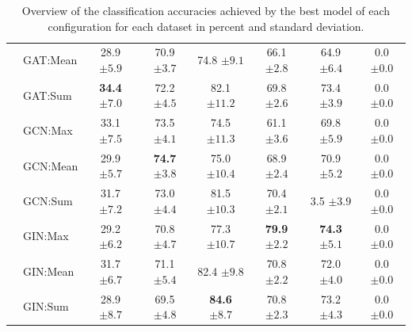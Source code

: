 \begin{table}
{\begin{tabular}{@{}c <{\enspace}@{}lcccccc@{}}
			\\ 
			& \textsf{GAT:Mean}    & 28.9 \scriptsize $\pm 5.9$          & 70.9 \scriptsize $\pm 3.7$           & 74.8 \scriptsize $\pm 9.1$            & 66.1 \scriptsize $\pm 2.8$         & 64.9 \scriptsize $\pm 6.4$       & 0.0 \scriptsize $\pm 0.0$
			\\ 
			& \textsf{GAT:Sum}                  & \textbf{34.4} \scriptsize $\pm 7.0$          & 72.2 \scriptsize $\pm 4.5$	            & 82.1 \scriptsize $\pm 11.2$            & 69.8 \scriptsize $\pm 2.6$	          & 73.4 \scriptsize $\pm 3.9$
			& 0.0 \scriptsize $\pm 0.0$          
			\\
			
			\cmidrule{2-8}
					
			& \textsf{GCN:Max} & 33.1 \scriptsize $\pm 7.5$ &	73.5 \scriptsize $\pm 4.1$	& 74.5 \scriptsize $\pm 11.3$ & 61.1 \scriptsize $\pm 3.6$ &	69.8 \scriptsize $\pm 5.9$ & 0.0 \scriptsize $\pm 0.0$  
			\\ 
			& \textsf{GCN:Mean} & 29.9 \scriptsize $\pm 5.7$ &	\textbf{74.7} \scriptsize $\pm 3.8$ & 75.0 \scriptsize $\pm 10.4$ &	68.9 \scriptsize $\pm 2.4$ &	70.9 \scriptsize $\pm 5.2$ & 0.0 \scriptsize $\pm 0.0$
			\\ 
			& \textsf{GCN:Sum} & 31.7 \scriptsize $\pm 7.2$ &	73.0 \scriptsize $\pm 4.4$	& 81.5 \scriptsize $\pm 10.3$ & 70.4 \scriptsize $\pm 2.1$ & 3.5 \scriptsize $\pm 3.9$ & 0.0 \scriptsize $\pm 0.0$                        
			\\
			\cmidrule{2-8}	
						
			& \textsf{GIN:Max} & 29.2 \scriptsize $\pm 6.2$	& 70.8 \scriptsize $\pm 4.7$ & 77.3 \scriptsize $\pm 10.7$ & \textbf{79.9} \scriptsize $\pm 2.2$ & \textbf{74.3} \scriptsize $\pm 5.1$ & 0.0 \scriptsize $\pm 0.0$   
			\\ 
			& \textsf{GIN:Mean}  & 31.7 \scriptsize $\pm 6.7$	& 71.1 \scriptsize $\pm 5.4$ & 82.4 \scriptsize $\pm 9.8$ & 	70.8 \scriptsize $\pm 2.2$ & 72.0 \scriptsize $\pm 4.0$ & 0.0 \scriptsize $\pm 0.0$
			\\ 
			& \textsf{GIN:Sum} & 28.9 \scriptsize $\pm 8.7$ & 	69.5 \scriptsize $\pm 4.8$	& \textbf{84.6} \scriptsize $\pm 8.7$ & 70.8 \scriptsize $\pm 2.3$ &	73.2 \scriptsize $\pm 4.3$ & 0.0 \scriptsize $\pm 0.0$
			\\
			\bottomrule
		\end{tabular}}
        \caption{Overview of the classification accuracies achieved by the best model of each configuration for each dataset in percent and standard deviation.}
        \label{tab:my_label}                  
\end{table}

